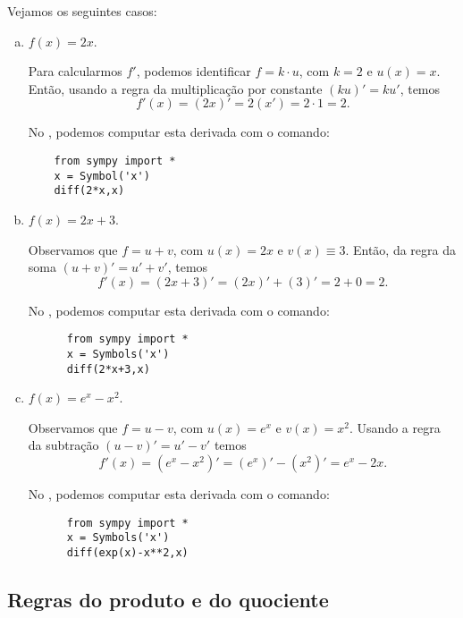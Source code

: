 \begin{ex}
  Vejamos os seguintes casos:
  \begin{enumerate}[a)]
  \item $f(x) = 2x$.

    Para calcularmos $f'$, podemos identificar $f = k\cdot u$, com $k=2$ e $u(x) = x$. Então, usando a regra da multiplicação por constante $(ku)' = ku'$, temos
    \begin{equation}
      f'(x) = (2x)' = 2(x') = 2\cdot 1 = 2.
    \end{equation}

  \ifispython
  No \sympy, podemos computar esta derivada com o comando:
  \begin{lstlisting}
    from sympy import *
    x = Symbol('x')
    diff(2*x,x)
  \end{lstlisting}
  \fi
    

  \item $f(x) = 2x + 3$.

    Observamos que $f = u + v$, com $u(x) = 2x$ e $v(x)\equiv 3$. Então, da regra da soma $(u+v)' = u' + v'$, temos
    \begin{equation}
      f'(x) = (2x + 3)' = (2x)' + (3)' = 2 + 0 = 2.
    \end{equation}

    \ifispython
    No \sympy, podemos computar esta derivada com o comando:
    \begin{lstlisting}
      from sympy import *
      x = Symbols('x')
      diff(2*x+3,x)
    \end{lstlisting}
    \fi

  \item $f(x) = e^x - x^2$.

    Observamos que $f = u-v$, com $u(x) = e^x$ e $v(x)= x^2$. Usando a regra da subtração $(u-v)' = u' - v'$ temos
    \begin{equation}
      f'(x) = (e^x - x^2)' = (e^x)' - (x^2)' = e^x - 2x.
    \end{equation}

    \ifispython
    No \sympy, podemos computar esta derivada com o comando:
    \begin{lstlisting}
      from sympy import *
      x = Symbols('x')
      diff(exp(x)-x**2,x)
    \end{lstlisting}
    \fi
  \end{enumerate}
\end{ex}

\subsection{Regras do produto e do quociente}

